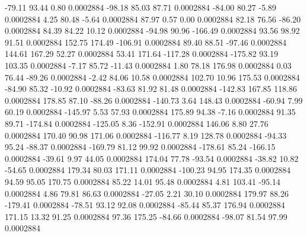       -79.11       93.44        0.80     0.0002884
      -98.18       85.03       87.71     0.0002884
      -84.00       80.27       -5.89     0.0002884
        4.25       80.48       -5.64     0.0002884
       87.97        0.57        0.00     0.0002884
       82.18       76.56      -86.20     0.0002884
       84.39       84.22       10.12     0.0002884
      -94.98       90.96     -166.49     0.0002884
       93.56       98.92       91.51     0.0002884
      152.75      174.49     -106.91     0.0002884
       89.40       88.51      -97.46     0.0002884
      144.61      167.29       52.27     0.0002884
       53.41      171.64     -117.28     0.0002884
     -175.82       93.19      103.35     0.0002884
       -7.17       85.72      -11.43     0.0002884
        1.80       78.18      176.98     0.0002884
        0.03       76.44      -89.26     0.0002884
       -2.42       84.06       10.58     0.0002884
      102.70       10.96      175.53     0.0002884
      -84.90       85.32      -10.92     0.0002884
      -83.63       81.92       81.48     0.0002884
     -142.83      167.85      118.86     0.0002884
      178.85       87.10      -88.26     0.0002884
     -140.73        3.64      148.43     0.0002884
      -60.94        7.99       60.19     0.0002884
     -145.97        5.53       57.93     0.0002884
      175.89       94.38       -7.16     0.0002884
       91.35       89.71     -174.84     0.0002884
     -125.05        8.36     -152.91     0.0002884
      146.06        8.80       27.76     0.0002884
      170.40       90.98      171.06     0.0002884
     -116.77        8.19      128.78     0.0002884
      -94.33       95.24      -88.37     0.0002884
     -169.79       81.12       99.92     0.0002884
     -178.61       85.24     -166.15     0.0002884
      -39.61        9.97       44.05     0.0002884
      174.04       77.78      -93.54     0.0002884
      -38.82       10.82      -54.65     0.0002884
      179.34       80.03      171.11     0.0002884
     -100.23       94.95      174.35     0.0002884
       94.59       95.05      170.75     0.0002884
       85.22       14.01       95.48     0.0002884
        4.81      103.41      -95.14     0.0002884
        4.86       79.81       86.63     0.0002884
      -27.05        2.21       30.10     0.0002884
      179.97       88.26     -179.41     0.0002884
      -78.51       93.12       92.08     0.0002884
      -85.44       85.37      176.94     0.0002884
      171.15       13.32       91.25     0.0002884
       97.36      175.25      -84.66     0.0002884
      -98.07       81.54       97.99     0.0002884
